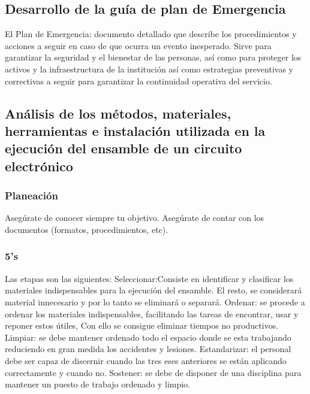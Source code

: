     \subsection{Desarrollo de la guía de plan de Emergencia}
    
    El Plan de Emergencia: documento detallado que describe los procedimientos y acciones a seguir en caso de que ocurra un evento inesperado. Sirve para garantizar la seguridad y el bienestar de las personas, así como para proteger los activos y la infraestructura de la institución así  como estrategias preventivas y correctivas a seguir para garantizar la continuidad operativa del servicio.
    \subsection{Análisis de los métodos, materiales, herramientas e instalación utilizada en la ejecución del ensamble de un circuito electrónico}
    
    \subsubsection{Planeación}
    
    Asegúrate de conocer siempre tu objetivo.
    Asegúrate de contar con los documentos (formatos, procedimientos, etc).
    \subsubsection{5's}
    
    Las etapas son las siguientes: Seleccionar:Consiste en identificar y clasificar los materiales indispensables para la ejecución del ensamble. El resto, se considerará material innecesario y por lo tanto se eliminará o separará.
    Ordenar: se procede a ordenar los materiales indispensables, facilitando las tareas de encontrar, usar y reponer estos útiles, Con ello se consigue eliminar tiempos no productivos.
    Limpiar: se debe mantener ordenado todo el espacio donde se esta trabajando reduciendo  en gran medida los accidentes y lesiones.
    Estandarizar: el personal debe ser capaz de discernir cuando las tres eses anteriores se están aplicando correctamente y cuando no.
    Sostener: se debe de disponer de una disciplina para mantener un puesto de trabajo ordenado y limpio.
